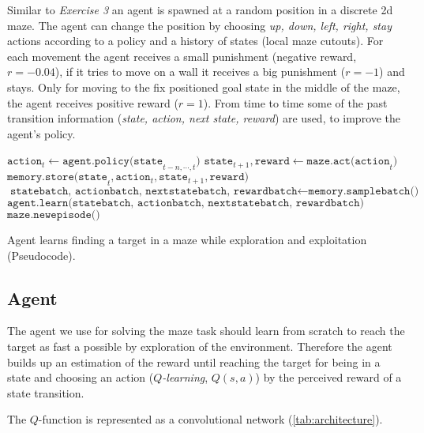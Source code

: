 \documentclass[a4paper,14pt]{article}
\begin{document}
Similar to \textit{Exercise 3} an agent is spawned at a random position in a
discrete 2d maze. The agent can change the position by choosing \textit{up, down, left, right, stay}
actions according to a policy and a history of states (local maze cutouts).
For each movement the agent receives a small punishment (negative reward, $r=-0.04$), if it tries to move on
a wall it receives a big punishment ($r=-1$) and stays.
Only for moving to the fix positioned goal state in the middle of the maze, the
agent receives positive reward ($r=1$).
From time to time some of the past transition information (\textit{state,
  action, next state, reward}) are used, to improve the agent's policy.

\begin{algorithm}
  \begin{algorithmic}
      \State $\texttt{action}_t \gets \texttt{agent.policy(state}_{t-n, \cdots, t})$
    \State $\texttt{state}_{t+1}, \texttt{reward} \gets \texttt{maze.act(action}_t\texttt{)}$
    \State $\texttt{memory.store(state}_t, \texttt{action}_t, \texttt{state}_{t+1}, \texttt{reward)}$
    \State $\texttt{statebatch, actionbatch, nextstatebatch, rewardbatch} \gets \texttt{memory.samplebatch()}$
      \State $\texttt{agent.learn(statebatch, actionbatch, nextstatebatch, rewardbatch)}$
      \EndIf
        \State $\texttt{maze.newepisode()}$
      \EndIf
    \EndFor
  \end{algorithmic}
  \caption{Agent learns finding a target in a maze while exploration and exploitation (Pseudocode).}
  \label{alg:train}
\end{algorithm}

\subsection{Agent}

The agent we use for solving the maze task should learn from scratch to reach
the target as fast a possible by exploration of the environment.
Therefore the agent builds up an estimation of the reward until reaching the
target for being in a state and choosing an action ($Q$\textit{-learning},
$Q(s,a)$) by the perceived reward of a state transition.

The $Q$-function is represented as a convolutional network (\autoref{tab:architecture}).
\end{document}
